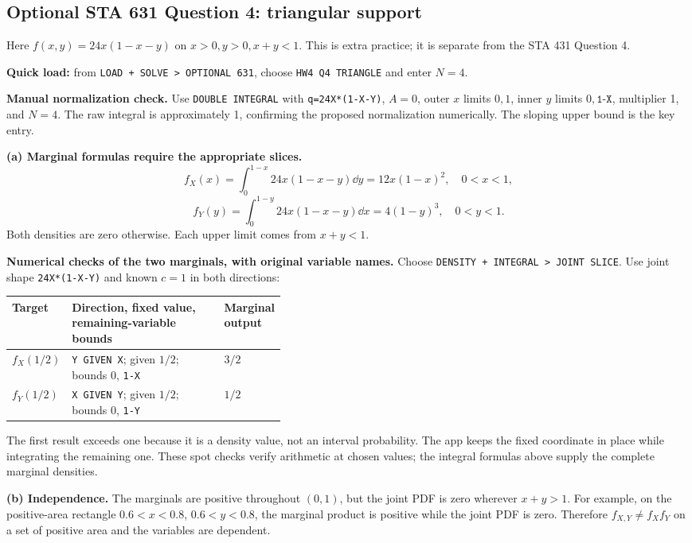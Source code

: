 \clearpage
\subsection{Optional STA 631 Question 4: triangular support}
Here $f(x,y)=24x(1-x-y)$ on $x>0,y>0,x+y<1$. This is extra practice; it is separate from the STA 431 Question 4.

\textbf{Quick load:} from \texttt{LOAD + SOLVE > OPTIONAL 631}, choose \texttt{HW4 Q4 TRIANGLE} and enter $N=4$.\par
\textbf{Manual normalization check.} Use \texttt{DOUBLE INTEGRAL} with \texttt{q=24X*(1-X-Y)}, $A=0$, outer $x$ limits $0,1$, inner $y$ limits $0,\texttt{1-X}$, multiplier 1, and $N=4$. The raw integral is approximately 1, confirming the proposed normalization numerically. The sloping upper bound is the key entry.

\textbf{(a) Marginal formulas require the appropriate slices.}
\[
\boxed{f_X(x)=\int_0^{1-x}24x(1-x-y)\dd y
=12x(1-x)^2,\quad0<x<1,}
\]
\[
\boxed{f_Y(y)=\int_0^{1-y}24x(1-x-y)\dd x
=4(1-y)^3,\quad0<y<1.}
\]
Both densities are zero otherwise. Each upper limit comes from $x+y<1$.

\textbf{Numerical checks of the two marginals, with original variable names.} Choose \texttt{DENSITY + INTEGRAL > JOINT SLICE}. Use joint shape \texttt{24X*(1-X-Y)} and known $c=1$ in both directions:
\begin{center}
\begin{tabularx}{\linewidth}{@{}p{0.19\linewidth}Xp{0.21\linewidth}@{}}
\toprule Target & Direction, fixed value, remaining-variable bounds & Marginal output\\\midrule
$f_X(1/2)$ & \texttt{Y GIVEN X}; given $1/2$; bounds $0$, \texttt{1-X} & $3/2$\\
$f_Y(1/2)$ & \texttt{X GIVEN Y}; given $1/2$; bounds $0$, \texttt{1-Y} & $1/2$\\\bottomrule
\end{tabularx}
\end{center}
The first result exceeds one because it is a density value, not an interval probability. The app keeps the fixed coordinate in place while integrating the remaining one. These spot checks verify arithmetic at chosen values; the integral formulas above supply the complete marginal densities.

\textbf{(b) Independence.} The marginals are positive throughout $(0,1)$, but the joint PDF is zero wherever $x+y>1$. For example, on the positive-area rectangle $0.6<x<0.8$, $0.6<y<0.8$, the marginal product is positive while the joint PDF is zero. Therefore $f_{X,Y}\ne f_Xf_Y$ on a set of positive area and the variables are dependent.

